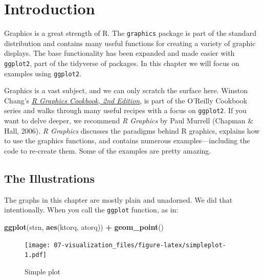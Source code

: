 \documentclass[
]{book}
\newenvironment{Shaded}{\begin{snugshade}}{\end{snugshade}}
\newcommand{\KeywordTok}[1]{\textcolor[rgb]{0.13,0.29,0.53}{\textbf{#1}}}
\newcommand{\NormalTok}[1]{#1}
\newcommand{\OperatorTok}[1]{\textcolor[rgb]{0.81,0.36,0.00}{\textbf{#1}}}
\newcommand{\StringTok}[1]{\textcolor[rgb]{0.31,0.60,0.02}{#1}}
\begin{document}
\hypertarget{intro-Graphics}{%
\section*{Introduction}\label{intro-Graphics}}

Graphics is a great strength of R. The \texttt{graphics} package is part of the
standard distribution and contains many useful functions for creating a
variety of graphic displays. The base functionality has been expanded and made easier with \texttt{ggplot2}, part of the tidyverse of packages. In this chapter we will focus on examples using \texttt{ggplot2}.

Graphics is a vast subject, and we can only scratch the surface here.
Winston Chang's \href{http://shop.oreilly.com/product/0636920063704.do}{\emph{R Graphics Cookbook, 2nd Edition}}, is part of the O'Reilly Cookbook series
and walks through many useful recipes with a focus on \texttt{ggplot2}.
If you want to delve deeper, we recommend \emph{R Graphics} by Paul Murrell
(Chapman \& Hall, 2006). \emph{R Graphics} discusses the paradigms behind R
graphics, explains how to use the graphics functions, and contains
numerous examples---including the code to re-create them. Some of the
examples are pretty amazing.

\hypertarget{the-illustrations}{%
\subsection*{The Illustrations}\label{the-illustrations}}

The graphs in this chapter are mostly plain and unadorned. We did that
intentionally. When you call the \texttt{ggplot} function, as in:

\begin{Shaded}
\begin{Highlighting}[]
\KeywordTok{ggplot}\NormalTok{(strn, }\KeywordTok{aes}\NormalTok{(ktorq, atorq)) }\OperatorTok{+}
\StringTok{  }\KeywordTok{geom_point}\NormalTok{()}
\end{Highlighting}
\end{Shaded}

\begin{figure}
\centering
\texttt{[image: 07-visualization\_files/figure-latex/simpleplot-1.pdf]}
\caption{\label{fig:simpleplot}Simple plot}
\end{figure}
\end{document}
